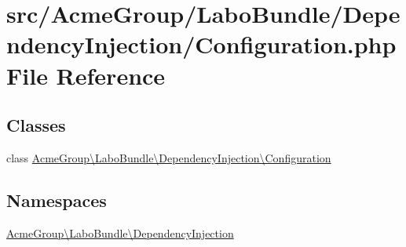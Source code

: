 \hypertarget{_labo_bundle_2_dependency_injection_2_configuration_8php}{\section{src/\+Acme\+Group/\+Labo\+Bundle/\+Dependency\+Injection/\+Configuration.php File Reference}
\label{_labo_bundle_2_dependency_injection_2_configuration_8php}
}
\subsection*{Classes}
\begin{DoxyCompactItemize}
\item 
class \hyperlink{class_acme_group_1_1_labo_bundle_1_1_dependency_injection_1_1_configuration}{Acme\+Group\textbackslash{}\+Labo\+Bundle\textbackslash{}\+Dependency\+Injection\textbackslash{}\+Configuration}
\end{DoxyCompactItemize}
\subsection*{Namespaces}
\begin{DoxyCompactItemize}
\item 
 \hyperlink{namespace_acme_group_1_1_labo_bundle_1_1_dependency_injection}{Acme\+Group\textbackslash{}\+Labo\+Bundle\textbackslash{}\+Dependency\+Injection}
\end{DoxyCompactItemize}
